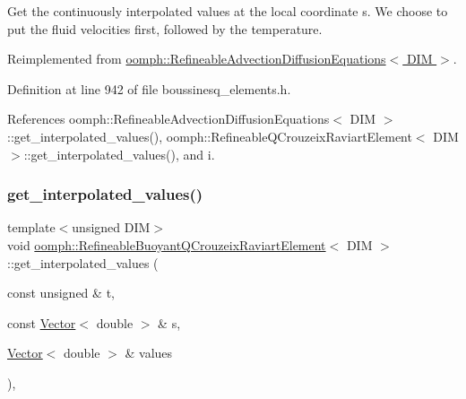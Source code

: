 Get the continuously interpolated values at the local coordinate s. We choose to put the fluid velocities first, followed by the temperature. 



Reimplemented from \hyperlink{classoomph_1_1RefineableAdvectionDiffusionEquations_af9dd36503e3196a7f640dbcebb22551d}{oomph\+::\+Refineable\+Advection\+Diffusion\+Equations$<$ D\+I\+M $>$}.



Definition at line 942 of file boussinesq\+\_\+elements.\+h.



References oomph\+::\+Refineable\+Advection\+Diffusion\+Equations$<$ D\+I\+M $>$\+::get\+\_\+interpolated\+\_\+values(), oomph\+::\+Refineable\+Q\+Crouzeix\+Raviart\+Element$<$ D\+I\+M $>$\+::get\+\_\+interpolated\+\_\+values(), and i.

\mbox{\label{classoomph_1_1RefineableBuoyantQCrouzeixRaviartElement_af178c04f0e6ee09a5d05574fcd68ac41}} 
\subsubsection{\texorpdfstring{get\+\_\+interpolated\+\_\+values()}{get\_interpolated\_values()}\hspace{0.1cm}{\footnotesize\ttfamily [2/2]}}
{\footnotesize\ttfamily template$<$unsigned D\+IM$>$ \\
void \hyperlink{classoomph_1_1RefineableBuoyantQCrouzeixRaviartElement}{oomph\+::\+Refineable\+Buoyant\+Q\+Crouzeix\+Raviart\+Element}$<$ D\+IM $>$\+::get\+\_\+interpolated\+\_\+values (\begin{DoxyParamCaption}\item[{const unsigned \&}]{t,  }\item[{const \hyperlink{classoomph_1_1Vector}{Vector}$<$ double $>$ \&}]{s,  }\item[{\hyperlink{classoomph_1_1Vector}{Vector}$<$ double $>$ \&}]{values }\end{DoxyParamCaption})\hspace{0.3cm}{\ttfamily [inline]}, {\ttfamily [virtual]}}



